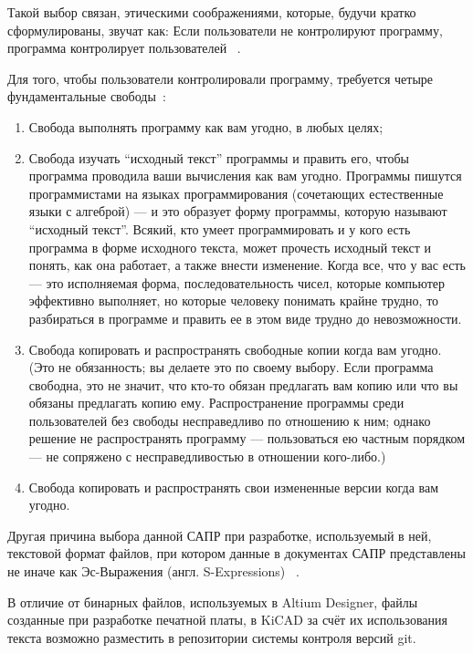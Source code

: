 Такой выбор связан, этическими соображениями, которые, будучи
кратко сформулированы, звучат как:
Если пользователи не контролируют программу,
программа контролирует пользователей ~\cite{unfair-nonfree-programms}.

Для того, чтобы пользователи контролировали программу, требуется
четыре фундаментальные свободы~\cite{unfair-nonfree-programms}:

\begin{enumerate}
\item Свобода выполнять программу как вам угодно, в любых целях;
  
\item Свобода изучать “исходный текст” программы и править его, чтобы
программа проводила ваши вычисления как вам угодно. Программы пишутся
программистами на языках программирования (сочетающих естественные
языки с алгеброй) — и это образует форму программы, которую называют
“исходный текст”. Всякий, кто умеет программировать и у кого есть
программа в форме исходного текста, может прочесть исходный текст и
понять, как она работает, а также внести изменение. Когда все, что у
вас есть — это исполняемая форма, последовательность чисел, которые
компьютер эффективно выполняет, но которые человеку понимать крайне
трудно, то разбираться в программе и править ее в этом виде трудно до
невозможности.

\item  Свобода копировать и распространять свободные копии когда вам
угодно. (Это не обязанность; вы делаете это по своему выбору. Если
программа свободна, это не значит, что кто-то обязан предлагать вам
копию или что вы обязаны предлагать копию ему. Распространение
программы среди пользователей без свободы несправедливо по отношению к
ним; однако решение не распространять программу — пользоваться ею
частным порядком — не сопряжено с несправедливостью в отношении
кого-либо.)

\item Свобода копировать и распространять свои измененные версии когда
вам угодно.
\end{enumerate}

Другая причина выбора данной САПР при разработке,
используемый в ней, текстовой формат файлов,
при котором данные в документах САПР представлены
не иначе как Эс-Выражения (англ. S-Expressions)
~\cite{kicad-sexpr}.

В отличие от бинарных файлов,
используемых в Altium Designer,
файлы созданные при разработке печатной платы,
в KiCAD за счёт их использования текста
возможно разместить в репозитории системы контроля версий
git.

